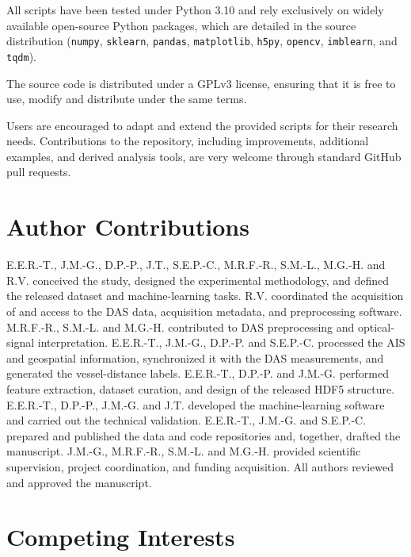 \documentclass[11pt]{article}
\begin{document}
All scripts have been tested under Python 3.10 and rely exclusively on widely available open-source Python packages, which are detailed in the source distribution (\texttt{numpy}, \texttt{sklearn}, \texttt{pandas}, \texttt{matplotlib}, \texttt{h5py}, \texttt{opencv}, \texttt{imblearn}, and \texttt{tqdm}).

The source code is distributed under a GPLv3 license, ensuring that it is free to use, modify and distribute under the same terms.

Users are encouraged to adapt and extend the provided scripts for their research needs. Contributions to the repository, including improvements, additional examples, and derived analysis tools, are very welcome through standard GitHub pull requests.








\section*{Author Contributions}

E.E.R.-T., J.M.-G., D.P.-P., J.T., S.E.P.-C., M.R.F.-R., S.M.-L., M.G.-H. and R.V. conceived the study, designed the experimental methodology, and defined the released dataset and machine-learning tasks. R.V. coordinated the acquisition of and access to the DAS data, acquisition metadata, and preprocessing software. M.R.F.-R., S.M.-L. and M.G.-H. contributed to DAS preprocessing and optical-signal interpretation. E.E.R.-T., J.M.-G., D.P.-P. and S.E.P.-C.  processed the AIS and geospatial information, synchronized it with the DAS measurements, and generated the vessel-distance labels. E.E.R.-T., D.P.-P. and J.M.-G. performed feature extraction, dataset curation, and design of the released HDF5 structure. E.E.R.-T., D.P.-P., J.M.-G. and J.T. developed the machine-learning software and carried out the technical validation. E.E.R.-T., J.M.-G. and S.E.P.-C.  prepared and published the data and code repositories and, together, drafted the manuscript. J.M.-G., M.R.F.-R., S.M.-L. and M.G.-H. provided scientific supervision, project coordination, and funding acquisition. All authors reviewed and approved the manuscript.


\section*{Competing Interests}
\label{sec:competing interests}
\end{document}
